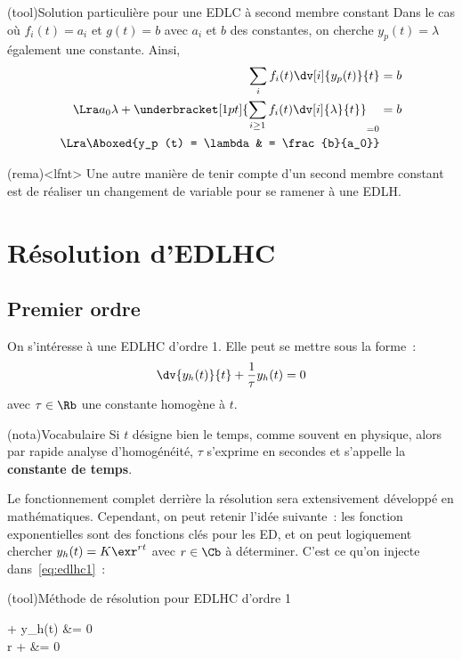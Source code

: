 \documentclass[a4paper, 11pt, garamond]{book}
\begin{document}
\begin{tcn}(tool){Solution particulière pour une EDLC à second membre
			constant}
	Dans le cas où $f_i(t) = a_i$ et $g(t) = b$ avec $a_i$ et $b$ des
	constantes, on cherche $y_p (t) = \lambda$ également une constante. Ainsi,
	\begin{align*}
		\sum_{i} f_i(t) \dv[i]{y_p(t)}{t} & = b
		\\\Lra
		a_0 \lambda +
		\underbracket[1pt]{
			\sum_{i \geq 1} f_i(t) \dv[i]{\lambda}{t}
		}_{ =0}                           & = b
		\\\Lra
		\Aboxed{y_p (t) = \lambda         & = \frac{b}{a_0}}
	\end{align*}
\end{tcn}

\begin{tcn}(rema)<lfnt>{}
	Une autre manière de tenir compte d'un second membre constant est de réaliser
	un changement de variable pour se ramener à une EDLH.
\end{tcn}

\section{Résolution d'EDLHC}
\subsection{Premier ordre}
On s'intéresse à une EDLHC d'ordre 1. Elle peut se mettre sous la forme~:
\begin{equation}
	\dv{y_h(t)}{t} + \frac{1}{\tau} y_h(t) = 0
	\label{eq:edlhc1}
\end{equation}
avec $\tau \in \Rb$ une constante homogène à $t$.
\begin{tcn}(nota){Vocabulaire}
	Si $t$ désigne bien le temps, comme souvent en physique, alors par rapide
	analyse d'homogénéité, $\tau$ s'exprime en secondes et s'appelle la
	\textbf{constante de temps}.
\end{tcn}

Le fonctionnement complet derrière la résolution sera extensivement développé en
mathématiques. Cependant, on peut retenir l'idée suivante~: les fonction
exponentielles sont des fonctions clés pour les ED, et on peut logiquement
chercher $y_h(t) = K\exr^{rt}$ avec $r \in \Cb$ à déterminer. C'est ce qu'on
injecte dans~\eqref{eq:edlhc1}~:

\begin{tcn}(tool){Méthode de résolution pour EDLHC d'ordre 1}
	\begin{DispWithArrows*}
		 +  y_h(t) &= 0
		\\\Ra
		r \times {} +  &= 0
		\\\Lra
	\end{DispWithArrows*}
\end{tcn}
\end{document}
